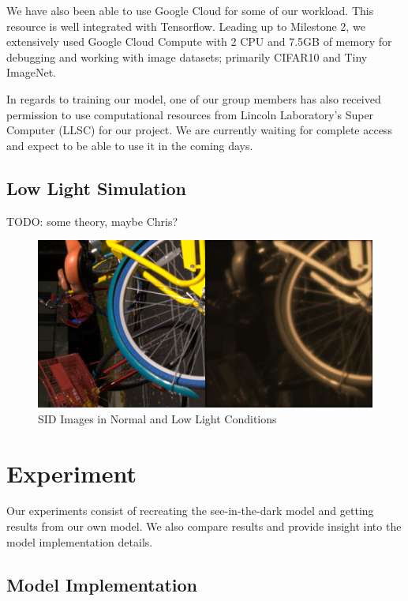 \documentclass{article}
\begin{document}
We have also been able to use Google Cloud for some of our workload. This
resource is well integrated with Tensorflow. Leading up to Milestone 2,
we extensively used Google Cloud Compute with 2 CPU and 7.5GB of memory
for debugging and working with image datasets; primarily CIFAR10 and
Tiny ImageNet. \newline

In regards to training our model, one of our group members has also
received permission to use computational resources from Lincoln
Laboratory's Super Computer (LLSC) for our project. We are currently
waiting for complete access and expect to be able to use it in the coming
days.

\subsection{Low Light Simulation}

TODO: some theory, maybe Chris?

\begin{figure}[ht]
  \centering
  \includegraphics[scale=0.1]{00002_00_train_100}
  \caption{ SID Images in Normal and Low Light Conditions}
  \label{fig:train}
\end{figure}


\section{Experiment}

Our experiments consist of recreating the see-in-the-dark model and
getting results from our own model. We also compare results and provide
insight into the model implementation details.

\subsection{Model Implementation}
\end{document}
